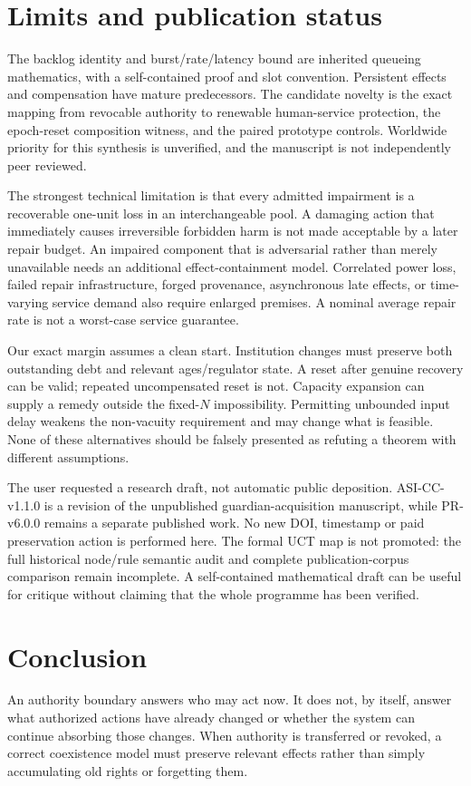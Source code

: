 \section{Limits and publication status}
The backlog identity and burst/rate/latency bound are inherited queueing mathematics, with a self-contained proof and slot convention. Persistent effects and compensation have mature predecessors. The candidate novelty is the exact mapping from revocable authority to renewable human-service protection, the epoch-reset composition witness, and the paired prototype controls. Worldwide priority for this synthesis is unverified, and the manuscript is not independently peer reviewed.

The strongest technical limitation is that every admitted impairment is a recoverable one-unit loss in an interchangeable pool. A damaging action that immediately causes irreversible forbidden harm is not made acceptable by a later repair budget. An impaired component that is adversarial rather than merely unavailable needs an additional effect-containment model. Correlated power loss, failed repair infrastructure, forged provenance, asynchronous late effects, or time-varying service demand also require enlarged premises. A nominal average repair rate is not a worst-case service guarantee.

Our exact margin assumes a clean start. Institution changes must preserve both outstanding debt and relevant ages/regulator state. A reset after genuine recovery can be valid; repeated uncompensated reset is not. Capacity expansion can supply a remedy outside the fixed-$N$ impossibility. Permitting unbounded input delay weakens the non-vacuity requirement and may change what is feasible. None of these alternatives should be falsely presented as refuting a theorem with different assumptions.

The user requested a research draft, not automatic public deposition. ASI-CC-v1.1.0 is a revision of the unpublished guardian-acquisition manuscript, while PR-v6.0.0 remains a separate published work. No new DOI, timestamp or paid preservation action is performed here. The formal UCT map is not promoted: the full historical node/rule semantic audit and complete publication-corpus comparison remain incomplete. A self-contained mathematical draft can be useful for critique without claiming that the whole programme has been verified.

\section{Conclusion}
An authority boundary answers who may act now. It does not, by itself, answer what authorized actions have already changed or whether the system can continue absorbing those changes. When authority is transferred or revoked, a correct coexistence model must preserve relevant effects rather than simply accumulating old rights or forgetting them.

